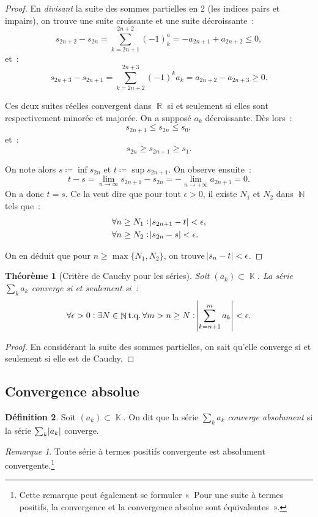 \documentclass{article}
\DeclareMathOperator{\K}{\mathbb K}
\DeclareMathOperator{\N}{\mathbb N}
\DeclareMathOperator{\R}{\mathbb R}
\DeclareMathOperator{\tq}{ t.q. }
\newtheorem{thm}{Théorème}[section]
\theoremstyle{definition}
\newtheorem{déf}[thm]{Définition}
\theoremstyle{remark}
\newtheorem*{rmq}{Remarque}
\begin{document}
		\begin{proof} En \emph{divisant} la suite des sommes partielles en 2 (les indices pairs et impairs), on trouve une suite croissante et une suite
		décroissante~:
		\[s_{2n+2} - s_{2n} = \sum_{k=2n+1}^{2n+2}(-1)^a_k = -a_{2n+1} + a_{2n+2} \leq 0,\]
		et~:
		\[s_{2n+3} - s_{2n+1} = \sum_{k=2n+2}^{2n+3}(-1)^ka_k = a_{2n+2} - a_{2n+3} \geq 0.\]

		Ces deux suites réelles convergent dans $\R$ si et seulement si elles sont respectivement minorée et majorée. On a supposé $a_k$ décroissante.
		Dès lors~:
		\[s_{2n+1} \leq s_{2n} \leq s_0,\]
		et~:
		\[s_{2n} \geq s_{2n+1} \geq s_1.\]

		On note alors $s \coloneqq \inf s_{2n}$ et $t \coloneqq \sup s_{2n+1}$. On observe ensuite~:
		\[t-s = \lim_{n \to \infty}s_{2n+1}-s_{2n} = -\lim_{n \to +\infty}a_{2n+1} = 0.\]
		On a donc $t = s$. Ce la veut dire que pour tout $\epsilon > 0$, il existe $N_1$ et $N_2$ dans $\N$ tels que~:
		\begin{align*}
			\forall n \geq N_1 &: \abs {s_{2n+1}-t} < \epsilon, \\
			\forall n \geq N_2 &: \abs {s_{2n} - s} < \epsilon.
		\end{align*}

		On en déduit que pour $n \geq \max\{N_1, N_2\}$, on trouve $\abs {s_n-t} < \epsilon$.
		\end{proof}

		\begin{thm}[Critère de Cauchy pour les séries] Soit $(a_k) \subset \K$. La série $\sum_k a_k$ converge si et seulement si~:
		\[\forall \epsilon > 0 : \exists N \in \N \tq \forall m > n \geq N : \abs {\sum_{k=n+1}^m a_k} < \epsilon.\]
		\end{thm}

		\begin{proof} En considérant la suite des sommes partielles, on sait qu'elle converge si et seulement si elle est de Cauchy. \end{proof}

	\subsection{Convergence absolue}
		\begin{déf} Soit $(a_k) \subset \K$. On dit que la série $\sum_k a_k$ \emph{converge absolument} si la série $\sum_k \abs {a_k}$ converge.
		\end{déf}

		\begin{rmq} Toute série à termes positifs convergente est absolument convergente.\footnote{Cette remarque peut également se formuler «~Pour une suite
		à termes positifs, la convergence et la convergence absolue sont équivalentes~».}
		\end{rmq}
\end{document}
